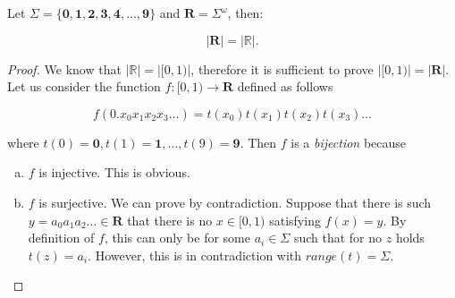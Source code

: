 \documentclass{article}
\title{}
\author{Adam Fiedler}
\begin{document}
\maketitle

Let $\Sigma = \{\mathbf{0}, \mathbf{1}, \mathbf{2}, \mathbf{3}, \mathbf{4}, \ldots, \mathbf{9}\}$ and $\mathbf{R} = \Sigma^\omega$, then:

\[ | \mathbf{R} | = | \mathbb{R} |. \]

\begin{proof}
We know that $|\mathbb{R}| = |[0, 1)|$, therefore it is sufficient to prove $| [0, 1) | = | \mathbf{R} |$.
Let us consider the function $f : [0, 1) \to \mathbf{R}$ defined as follows

\[f(0.x_0x_1x_2x_3\ldots) = t(x_0)t(x_1)t(x_2)t(x_3)\ldots\]

\noindent where $t(0) = \mathbf{0}, t(1) = \mathbf{1}, \ldots, t(9) = \mathbf{9}$. Then $f$ is a \emph{bijection} because 

\begin{enumerate}[a)]
\item $f$ is injective. This is obvious.
\item $f$ is surjective. 
We can prove by contradiction. 
Suppose that there is such $y = a_0a_1a_2\ldots \in \mathbf{R}$ that there is no $x \in [0, 1)$ satisfying $f(x) = y$. 
By definition of $f$, this can only be for some $a_i \in \Sigma$ such that for no $z$ holds $t(z) = a_i$. 
However, this is in contradiction with $range(t) = \Sigma$.
\end{enumerate}

\end{proof}
\end{document}
